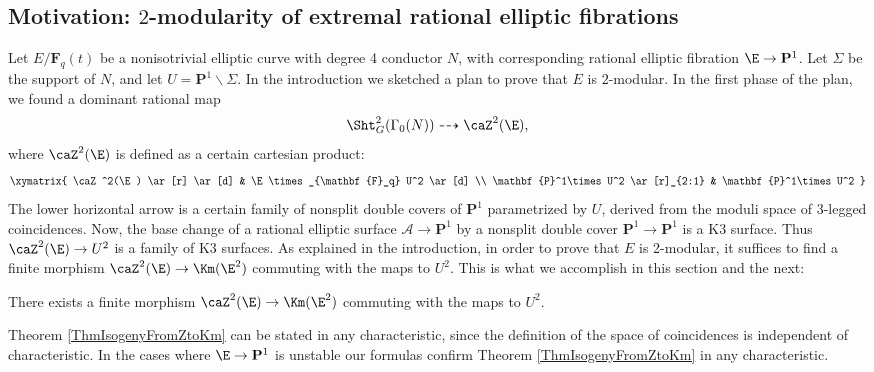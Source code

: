 \documentclass{article}
\def\F{\mathbf{F}}
\def\P{\mathbf{P}}
\begin{document}
\subsection{Motivation: $2$-modularity of extremal rational elliptic fibrations}
Let $E/\F_q(t)$ be a nonisotrivial elliptic curve with degree 4 conductor $N$, with corresponding rational elliptic fibration $\E\to \P^1$.  Let $\Sigma$ be the support of $N$, and let $U=\P^1\smallsetminus \Sigma$.    In the introduction we sketched a plan to prove that $E$ is $2$-modular.  In the first phase of the plan, we found a dominant rational map
\[ \Sht^2_G(\Gamma_0(N)) \dashrightarrow \caZ^2(\E), \]
where $\caZ^2(\E)$ is defined as a certain cartesian product:
\begin{equation}
 \xymatrix{
\caZ^2(\E) \ar[r] \ar[d] & \E\times_{\F_q} U^2 \ar[d] \\
 \P^1\times U^2 \ar[r]_{2:1} & \P^1\times U^2
} 
 \end{equation}
The lower horizontal arrow is a certain family of nonsplit double covers of $\P^1$ parametrized by $U$, derived from the moduli space of 3-legged coincidences.  Now, the base change of a rational elliptic surface $\mathcal{A}\to \P^1$ by a nonsplit double cover $\P^1\to \P^1$ is a K3 surface.  Thus $\caZ^2(\E)\to U^2$ is a family of K3 surfaces.  As explained in the introduction, in order to prove that $E$ is 2-modular, it suffices to find a finite morphism $\caZ^2(\E) \to \Km(\E^2)$ commuting with the maps to $U^2$.  This is what we accomplish in this section and the next:

\begin{thm}  \label{ThmIsogenyFromZtoKm} There exists a finite morphism $\caZ^2(\E)\to \Km(\E^2)$ commuting with the maps to $U^2$.
\end{thm}

\begin{rmk} Theorem \ref{ThmIsogenyFromZtoKm} can be stated in any characteristic, since the definition of the space of coincidences is independent of characteristic.  In the cases where $\E\to \P^1$ is unstable our formulas confirm Theorem \ref{ThmIsogenyFromZtoKm} in any characteristic.  
\end{rmk}
%
%
\end{document}
